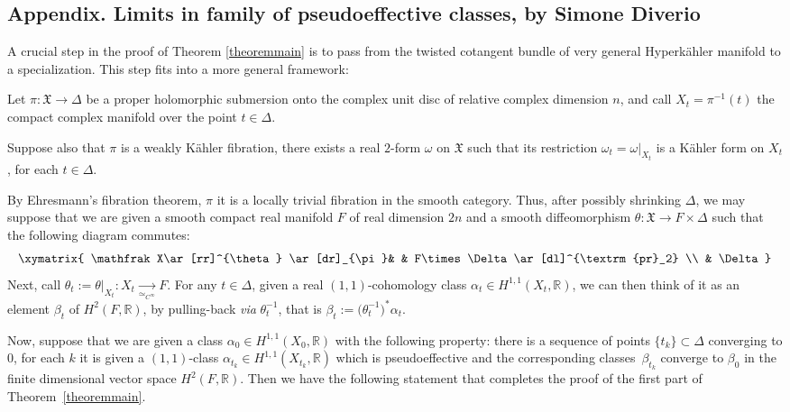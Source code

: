 \begin{appendix}
\renewcommand{\thefootnote}{*}
\section*{Appendix. Limits in family of pseudoeffective classes, by Simone Diverio\texorpdfstring{\protect\footnotemark}{fn}}
\label{appendixdiverio}

A crucial step in the proof of Theorem \ref{theoremmain} is to pass from the twisted cotangent bundle of very general Hyperkähler manifold to a specialization. This step fits into a more general framework:

Let $\pi\colon\mathfrak X\to\Delta$ be a proper holomorphic submersion onto the complex unit disc of relative complex dimension $n$, and call $X_t=\pi^{-1}(t)$ the compact complex manifold over the point $t\in\Delta$.

Suppose also that $\pi$ is a weakly Kähler fibration, \ie there exists a real $2$-form $\omega$ on $\mathfrak X$ such that its restriction $\omega_t=\omega|_{X_t}$ is a Kähler form on $X_t$, for each $t\in\Delta$.

By Ehresmann's fibration theorem, $\pi$ it is a locally trivial fibration in the smooth category. Thus, after possibly shrinking $\Delta$, we may suppose that we are given a smooth compact real manifold $F$ of real dimension $2n$ and a smooth diffeomorphism $\theta\colon\mathfrak X\to F\times\Delta$ such that the following diagram commutes:
\[
\xymatrix{
\mathfrak X\ar[rr]^{\theta} \ar[dr]_{\pi}& & F\times\Delta \ar[dl]^{\textrm{pr}_2} \\
& \Delta
}
\]
Next, call $\theta_t:=\theta|_{X_t}\colon X_t\underset{\simeq_{C^\infty}}\to F$. For any $t\in\Delta$, given a real $(1,1)$-cohomology class $\alpha_t\in H^{1,1}(X_t,\mathbb R)$, we can then think of it as an element $\beta_t$ of $H^2(F,\mathbb R)$, by pulling-back \textsl{via} $\theta_t^{-1}$, that is $\beta_t:=\bigl(\theta_t^{-1}\bigr)^*\alpha_t$.

Now, suppose that we are given a class $\alpha_0\in H^{1,1}(X_0,\mathbb R)$ with the following property: there is a sequence of points $\{t_k\}\subset\Delta$ converging to $0$, for each $k$ it is given a $(1,1)$-class $\alpha_{t_k}\in H^{1,1}(X_{t_k},\mathbb R)$ which is pseudoeffective and the corresponding classes~$\beta_{t_k}$ converge to $\beta_0$ in the finite dimensional vector space $H^2(F,\mathbb R)$. Then we have the following statement that completes the proof of the first part of Theorem~\ref{theoremmain}.


\end{appendix}
